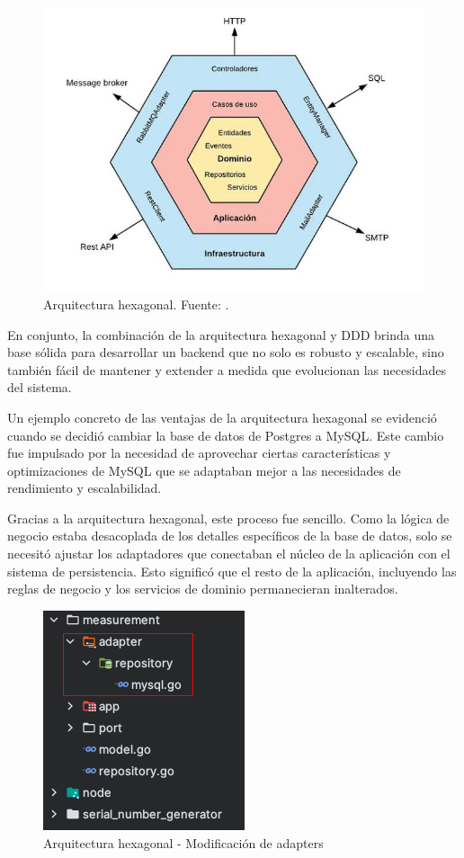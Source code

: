 {\begin{figure}[H]
	\centering
	\includegraphics[scale=.5]{./Figures/PortalWeb/Arquitectura-Hexagonal.jpeg}
	\caption{Arquitectura hexagonal. Fuente: \citep{ArquitecturaHexagonal:15}.}
	\label{fig:arquitecturahexagonal}
\end{figure}

En conjunto, la combinación de la arquitectura hexagonal y DDD  brinda una base sólida para desarrollar un backend que no solo es robusto y escalable, sino también fácil de mantener y extender a medida que evolucionan las necesidades del sistema. 

Un ejemplo concreto de las ventajas de la arquitectura hexagonal se evidenció cuando se decidió cambiar la base de datos de Postgres a MySQL. Este cambio fue impulsado por la necesidad de aprovechar ciertas características y optimizaciones de MySQL que se adaptaban mejor a las necesidades de rendimiento y escalabilidad.

Gracias a la arquitectura hexagonal, este proceso fue sencillo. Como la lógica de negocio estaba desacoplada de los detalles específicos de la base de datos, solo se necesitó ajustar los adaptadores que conectaban el núcleo de la aplicación con el sistema de persistencia. Esto significó que el resto de la aplicación, incluyendo las reglas de negocio y los servicios de dominio permanecieran inalterados.

\begin{figure}[H]
	\centering
	\includegraphics[scale=.7]{./Figures/PortalWeb/Ej_cambio-adapters.png}
	\caption{Arquitectura hexagonal - Modificación de adapters}
	\label{fig:modifAdapters}
\end{figure}

}
